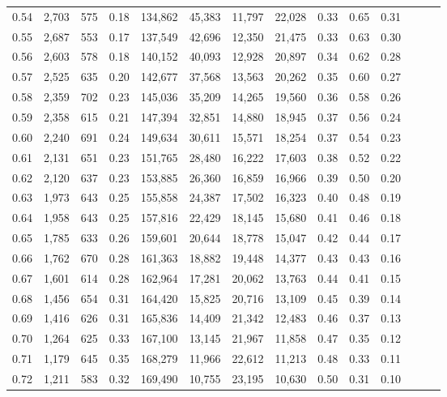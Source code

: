 \begin{tabular}{rrrrrrrrrrrrrr}
0.54 &  2,703 &  575 &  0.18 &  134,862 &   45,383 &  11,797 &  22,028 &  0.33 &  0.65 &      0.31 \\
0.55 &  2,687 &  553 &  0.17 &  137,549 &   42,696 &  12,350 &  21,475 &  0.33 &  0.63 &      0.30 \\
0.56 &  2,603 &  578 &  0.18 &  140,152 &   40,093 &  12,928 &  20,897 &  0.34 &  0.62 &      0.28 \\
0.57 &  2,525 &  635 &  0.20 &  142,677 &   37,568 &  13,563 &  20,262 &  0.35 &  0.60 &      0.27 \\
0.58 &  2,359 &  702 &  0.23 &  145,036 &   35,209 &  14,265 &  19,560 &  0.36 &  0.58 &      0.26 \\
0.59 &  2,358 &  615 &  0.21 &  147,394 &   32,851 &  14,880 &  18,945 &  0.37 &  0.56 &      0.24 \\
0.60 &  2,240 &  691 &  0.24 &  149,634 &   30,611 &  15,571 &  18,254 &  0.37 &  0.54 &      0.23 \\
0.61 &  2,131 &  651 &  0.23 &  151,765 &   28,480 &  16,222 &  17,603 &  0.38 &  0.52 &      0.22 \\
0.62 &  2,120 &  637 &  0.23 &  153,885 &   26,360 &  16,859 &  16,966 &  0.39 &  0.50 &      0.20 \\
0.63 &  1,973 &  643 &  0.25 &  155,858 &   24,387 &  17,502 &  16,323 &  0.40 &  0.48 &      0.19 \\
0.64 &  1,958 &  643 &  0.25 &  157,816 &   22,429 &  18,145 &  15,680 &  0.41 &  0.46 &      0.18 \\
0.65 &  1,785 &  633 &  0.26 &  159,601 &   20,644 &  18,778 &  15,047 &  0.42 &  0.44 &      0.17 \\
0.66 &  1,762 &  670 &  0.28 &  161,363 &   18,882 &  19,448 &  14,377 &  0.43 &  0.43 &      0.16 \\
0.67 &  1,601 &  614 &  0.28 &  162,964 &   17,281 &  20,062 &  13,763 &  0.44 &  0.41 &      0.15 \\
0.68 &  1,456 &  654 &  0.31 &  164,420 &   15,825 &  20,716 &  13,109 &  0.45 &  0.39 &      0.14 \\
0.69 &  1,416 &  626 &  0.31 &  165,836 &   14,409 &  21,342 &  12,483 &  0.46 &  0.37 &      0.13 \\
0.70 &  1,264 &  625 &  0.33 &  167,100 &   13,145 &  21,967 &  11,858 &  0.47 &  0.35 &      0.12 \\
0.71 &  1,179 &  645 &  0.35 &  168,279 &   11,966 &  22,612 &  11,213 &  0.48 &  0.33 &      0.11 \\
0.72 &  1,211 &  583 &  0.32 &  169,490 &   10,755 &  23,195 &  10,630 &  0.50 &  0.31 &      0.10 \\

\end{tabular}
